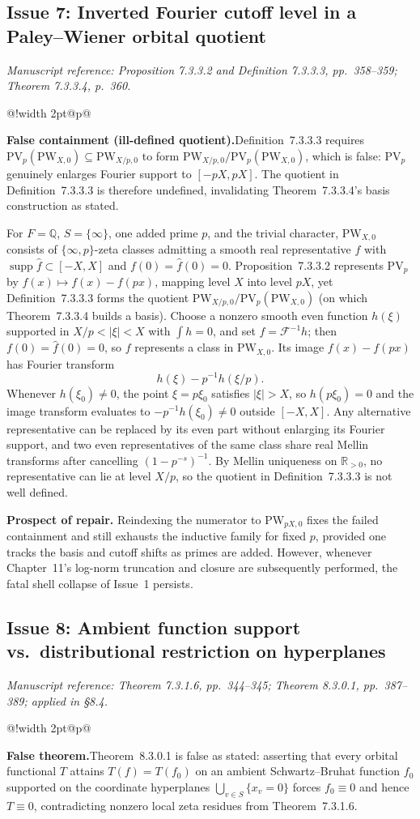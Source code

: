 \documentclass[11pt,letterpaper]{article}
\makeatletter
\newcommand{\msloc}[1]{%
  {\small\color{locgray}\itshape Manuscript reference: #1.}\par\nobreak\vspace{3pt}\@afterindentfalse\@afterheading
}
\newcommand{\issuefinding}[2]{%
  \begingroup
  \setlength{\fboxsep}{0pt}%
  \noindent\colorbox{barbg}{%
    \begin{tabular}{@{}!{\color{baraccent}\vrule width 2pt}@{\hspace{8pt}}p{\dimexpr\linewidth-18pt\relax}@{\hspace{8pt}}}
      \rule{0pt}{11.5pt}\small\textbf{\color{baraccent}#1}\enspace #2\rule[-4.5pt]{0pt}{0pt}
    \end{tabular}%
  }%
  \endgroup
  \par\nobreak\vspace{4.5pt}\@afterindentfalse\@afterheading
}
\newcommand{\Q}{\mathbb{Q}}
\newcommand{\R}{\mathbb{R}}
\DeclareMathOperator{\supp}{supp}
\makeatother
\begin{document}
\subsection{Issue 7: Inverted Fourier cutoff level in a Paley--Wiener orbital quotient}
\msloc{Proposition 7.3.3.2 and Definition 7.3.3.3, pp.~358--359; Theorem 7.3.3.4, p.~360}
\issuefinding{False containment (ill-defined quotient).}{Definition~7.3.3.3 requires $\mathrm{PV}_p(\mathrm{PW}_{X,0})\subseteq\mathrm{PW}_{X/p,0}$ to form $\mathrm{PW}_{X/p,0}/\mathrm{PV}_p(\mathrm{PW}_{X,0})$, which is false: $\mathrm{PV}_p$ genuinely enlarges Fourier support to $[-pX,pX]$. The quotient in Definition~7.3.3.3 is therefore undefined, invalidating Theorem~7.3.3.4's basis construction as stated.}

For $F=\Q$, $S=\{\infty\}$, one added prime $p$, and the trivial character, $\mathrm{PW}_{X,0}$ consists of $\{\infty,p\}$-zeta classes admitting a smooth real representative $f$ with $\supp\widehat{f}\subset[-X,X]$ and $f(0)=\widehat{f}(0)=0$. Proposition~7.3.3.2 represents $\mathrm{PV}_p$ by $f(x)\mapsto f(x)-f(px)$, mapping level $X$ into level $pX$, yet Definition~7.3.3.3 forms the quotient $\mathrm{PW}_{X/p,0}/\mathrm{PV}_p(\mathrm{PW}_{X,0})$ (on which Theorem~7.3.3.4 builds a basis). Choose a nonzero smooth even function $h(\xi)$ supported in $X/p<|\xi|<X$ with $\int h=0$, and set $f=\mathcal{F}^{-1}h$; then $f(0)=\widehat{f}(0)=0$, so $f$ represents a class in $\mathrm{PW}_{X,0}$. Its image $f(x)-f(px)$ has Fourier transform
\[
  h(\xi) - p^{-1}h(\xi/p).
\]
Whenever $h(\xi_0)\ne 0$, the point $\xi=p\xi_0$ satisfies $|\xi|>X$, so $h(p\xi_0)=0$ and the image transform evaluates to $-p^{-1}h(\xi_0)\ne 0$ outside $[-X,X]$. Any alternative representative can be replaced by its even part without enlarging its Fourier support, and two even representatives of the same class share real Mellin transforms after cancelling $(1-p^{-s})^{-1}$. By Mellin uniqueness on $\R_{>0}$, no representative can lie at level $X/p$, so the quotient in Definition~7.3.3.3 is not well defined.

\textbf{Prospect of repair.} Reindexing the numerator to $\mathrm{PW}_{pX,0}$ fixes the failed containment and still exhausts the inductive family for fixed $p$, provided one tracks the basis and cutoff shifts as primes are added. However, whenever Chapter~11's log-norm truncation and closure are subsequently performed, the fatal shell collapse of Issue~1 persists.

\subsection{Issue 8: Ambient function support vs.\ distributional restriction on hyperplanes}
\msloc{Theorem 7.3.1.6, pp.~344--345; Theorem 8.3.0.1, pp.~387--389; applied in \S8.4}
\issuefinding{False theorem.}{Theorem~8.3.0.1 is false as stated: asserting that every orbital functional $T$ attains $T(f)=T(f_0)$ on an ambient Schwartz--Bruhat function $f_0$ supported on the coordinate hyperplanes $\bigcup_{v\in S}\{x_v=0\}$ forces $f_0\equiv 0$ and hence $T\equiv 0$, contradicting nonzero local zeta residues from Theorem~7.3.1.6.}
\end{document}
